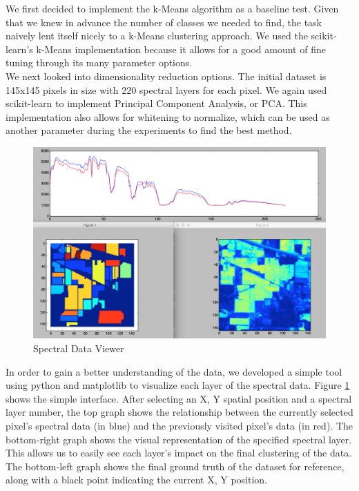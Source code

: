 \documentclass[journal]{IEEEtran}
\begin{document}
    We first decided to implement the k-Means algorithm as a baseline test. Given that we knew in advance the number of classes we needed to find, the task naively lent itself nicely to a k-Means clustering approach. We used the scikit-learn's k-Means \cite{ScikitLearnAPI} implementation because it allows for a good amount of fine tuning through its many parameter options.\\

    We next looked into dimensionality reduction options. The initial dataset is 145x145 pixels in size with 220 spectral layers for each pixel. We again used scikit-learn to implement Principal Component Analysis, or PCA. This implementation also allows for whitening to normalize, which can be used as another parameter during the experiments to find the best method.\\

    \begin{figure}[h!]
      \centering\includegraphics[width=\columnwidth]{images/tool.png}
      \caption{Spectral Data Viewer}
      \label{fig:Viewer}
    \end{figure}

    In order to gain a better understanding of the data, we developed a simple tool using python and matplotlib to visualize each layer of the spectral data. Figure \ref{fig:Viewer} shows the simple interface. After selecting an X, Y spatial position and a spectral layer number, the top graph shows the relationship between the currently selected pixel’s spectral data (in blue) and the previously visited pixel’s data (in red). The bottom-right graph shows the visual representation of the specified spectral layer. This allows us to easily see each layer’s impact on the final clustering of the data. The bottom-left graph shows the final ground truth of the dataset for reference, along with a black point indicating the current X, Y position.\\
\end{document}
